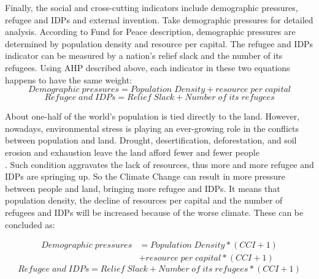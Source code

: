 \documentclass[a4paper,12pt]{article}
\begin{document}
Finally, the social and cross-cutting indicators include demographic pressures, refugee and IDPs and external invention. Take demographic pressures for detailed analysis. According to Fund for Peace description, demographic pressures are determined by population density and resource per capital. The refugee and IDPs indicator can be measured by a nation's relief slack and the number of its refugees. Using AHP described above, each indicator in these two equations happens to have the same weight:
\begin{equation}
Demographic\;pressures=Population\;Density+resource\;per\;capital
\end{equation}
\begin{equation}
Refugee\;and\;IDPs=Relief\;Slack+Number\;of\;its\;refugees
\end{equation}

About one-half of the world's population is tied directly to the land. However, nowadays, environmental stress is playing an ever-growing role in the conflicts between population and land. Drought, desertification, deforestation, and soil erosion and exhaustion leave the land afford fewer and fewer people\\\citep{Krakowka2012Modeling}. Such condition aggravates the lack of resources, thus more and more refugee and IDPs are springing up. So the Climate Change can result in more pressure between people and land, bringing more refugee and IDPs. It means that population density, the decline of resources per capital and the number of refugees and IDPs will be increased because of the worse climate. These can be concluded as:

\begin{equation}
\label{eq16}
\begin{split}
Demographic\;pressures&=Population\;Density*(CCI+1)\\ &+resource\;per\;capital*(CCI+1)
\end{split}
\end{equation}
\begin{equation}
\label{eq17}
Refugee\;and\;IDPs=Relief\;Slack+Number\;of\;its\;refugees*(CCI+1)
\end{equation}
\end{document}
